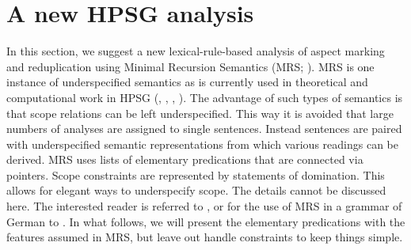 \section{A new HPSG analysis}\label{sec:analysis}

In this section, we suggest a new lexical-rule-based analysis of aspect marking and reduplication
using Minimal Recursion Semantics (MRS; \citealt{Copestakeetal2005}). %
MRS is one instance of underspecified semantics as is currently used in theoretical and
computational work in HPSG (\citealt[Section~6]{KR2024a}, \citealt[Section~3]{BFO2002a-u},
\citealt[Section~4.4]{MuellerCoreGram}, \citealt[Chapter~5]{MuellerLehrbuch4}). The advantage of
such types of semantics is that scope relations can be left underspecified. This way it is avoided
that large numbers of analyses are assigned to single sentences. Instead sentences are paired with
underspecified semantic representations from which various readings can be derived.
MRS uses lists of elementary predications that are connected via pointers. Scope constraints are
represented by statements of domination. This allows for elegant ways to underspecify scope. The
details cannot be discussed here. The interested reader is referred to \citet{Copestakeetal2005},
\citet[Section~6]{KR2024a} or for the use of MRS in a grammar of German to \citet[Chapter~5]{MuellerLehrbuch4}. In
what follows, we will present the elementary predications with the features assumed in MRS, but leave
out handle constraints to keep things simple.


